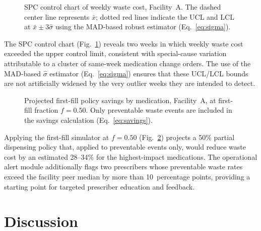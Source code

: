 \documentclass[letterpaper, 10pt, conference]{IEEEconf}
\begin{document}
\begin{figure}[h]
\centering
{}
\caption{SPC control chart of weekly waste cost, Facility~A. The dashed
center line represents $\bar{x}$; dotted red lines indicate the UCL and LCL
at $\bar{x} \pm 3\hat{\sigma}$ using the MAD-based robust estimator
(Eq.~\ref{eq:sigma}).}
\label{fig:spc}
\end{figure}

The SPC control chart (Fig.~\ref{fig:spc}) reveals two weeks in which weekly
waste cost exceeded the upper control limit, consistent with special-cause
variation attributable to a cluster of same-week medication change orders.
The use of the MAD-based $\hat{\sigma}$ estimator (Eq.~\ref{eq:sigma}) ensures
that these UCL/LCL bounds are not artificially widened by the very outlier
weeks they are intended to detect.

\begin{figure}[h]
\centering
{}
\caption{Projected first-fill policy savings by medication, Facility~A,
at first-fill fraction $f = 0.50$. Only preventable waste events are
included in the savings calculation (Eq.~\ref{eq:savings}).}
\label{fig:simulator}
\end{figure}

Applying the first-fill simulator at $f = 0.50$ (Fig.~\ref{fig:simulator})
projects a 50\% partial dispensing policy that, applied to preventable events
only, would reduce waste cost by an estimated 28--34\% for the highest-impact
medications.
The operational alert module additionally flags two prescribers whose
preventable waste rates exceed the facility peer median by more than
10~percentage points, providing a starting point for targeted prescriber
education and feedback.

\section{Discussion}
\end{document}
